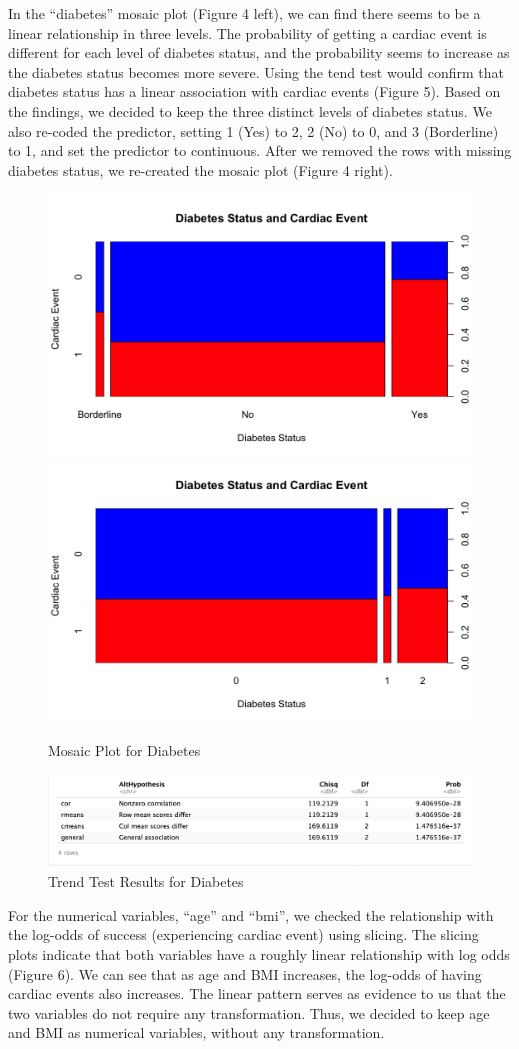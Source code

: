 \documentclass[12pt]{article}
\begin{document}
\newpage

In the “diabetes” mosaic plot (Figure 4 left), we can find there seems to be a linear relationship in three levels. The probability of getting a cardiac event is different for each level of diabetes status, and the probability seems to increase as the diabetes status becomes more severe. Using the tend test would confirm that diabetes status has a linear association with cardiac events (Figure 5). Based on the findings, we decided to keep the three distinct levels of diabetes status. We also re-coded the predictor, setting 1 (Yes) to 2, 2 (No) to 0, and 3 (Borderline) to 1, and set the predictor to continuous. After we removed the rows with missing diabetes status, we re-created the mosaic plot (Figure 4 right).

\begin{figure}[!ht]
\centering
\includegraphics[width=0.4\linewidth]{Img/Diabetes Status and Cardiac Event.png}
\includegraphics[width=0.4\linewidth]{Img/Diabetes Status and Cardiac Event Process.png}
\caption{Mosaic Plot for Diabetes}
\end{figure}

\begin{figure}[!ht]
\centering
\includegraphics[width=\textwidth]{Img/diabetes CMHtest.png}
\caption{Trend Test Results for Diabetes}
\end{figure}
\newpage
For the numerical variables, “age” and “bmi”, we checked the relationship with the log-odds of success (experiencing cardiac event) using slicing. The slicing plots indicate that both variables have a roughly linear relationship with log odds (Figure 6). We can see that  as age and BMI increases, the log-odds of having cardiac events also increases. The linear pattern serves as evidence to us that the two variables do not require any transformation. Thus, we decided to keep age and BMI as numerical variables, without any transformation.
\end{document}
